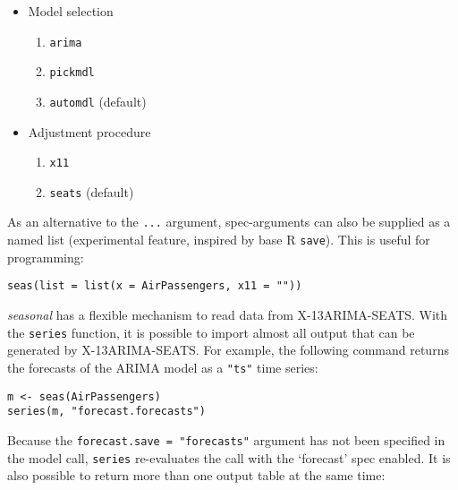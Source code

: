 \begin{itemize}
\itemsep1pt\parskip0pt
\item
  Model selection

  \begin{enumerate}
  \def\labelenumi{\arabic{enumi}.}
  \itemsep1pt\parskip0pt
  \item
    \texttt{arima}
  \item
    \texttt{pickmdl}
  \item
    \texttt{automdl} (default)
  \end{enumerate}
\item
  Adjustment procedure

  \begin{enumerate}
  \def\labelenumi{\arabic{enumi}.}
  \itemsep1pt\parskip0pt
  \item
    \texttt{x11}
  \item
    \texttt{seats} (default)
  \end{enumerate}
\end{itemize}

As an alternative to the \texttt{...} argument, spec-arguments can also
be supplied as a named list (experimental feature, inspired by base R
\texttt{save}). This is useful for programming:

\begin{verbatim}
seas(list = list(x = AirPassengers, x11 = ""))
\end{verbatim}


\emph{seasonal} has a flexible mechanism to read data from
X-13ARIMA-SEATS. With the \texttt{series} function, it is possible to
import almost all output that can be generated by X-13ARIMA-SEATS. For
example, the following command returns the forecasts of the ARIMA model
as a \texttt{"ts"} time series:

\begin{verbatim}
m <- seas(AirPassengers)
series(m, "forecast.forecasts")
\end{verbatim}

Because the \texttt{forecast.save = "forecasts"} argument has not been
specified in the model call, \texttt{series} re-evaluates the call with
the `forecast' spec enabled. It is also possible to return more than one
output table at the same time:

